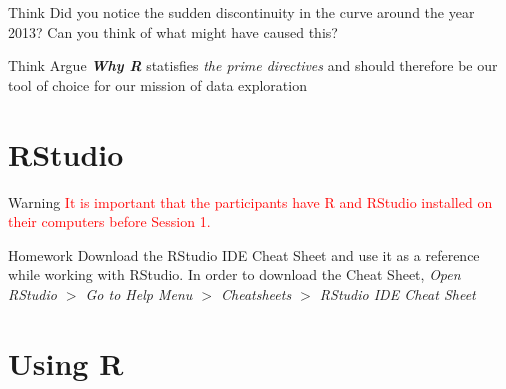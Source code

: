 \begin{DIY}{Think}
Did you notice the sudden discontinuity in the curve around the year 2013? Can you think of what might have caused this?
\end{DIY}

\begin{DIY}{Think}
Argue \textbf{\emph{Why R}} statisfies \emph{the prime directives} and should therefore be our tool of choice for our mission of data exploration
\end{DIY}
    
\section{RStudio}

\begin{HIGHLIGHT}
\par{}
\end{HIGHLIGHT}

\begin{DIY}{Warning}
\textcolor{red}{It is important that the participants have R and RStudio installed on their computers before Session 1.}
\end{DIY}

\begin{DIY}{Homework}
Download the RStudio IDE Cheat Sheet and use it as a reference while working with RStudio. In order to download the Cheat Sheet, \emph{Open RStudio $>$ Go to  Help Menu $>$ Cheatsheets $>$ RStudio IDE Cheat Sheet}
\end{DIY}


\section{Using R}
